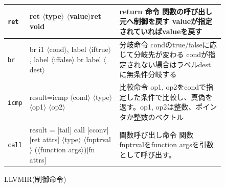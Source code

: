 \documentclass[dvipdfmx,a4j]{jbook}
\begin{document}
\begin{figure}[H]
\begin{center}
{\scriptsize
\begin{tabularx}{\textwidth}{|l|X|X|}\hline
{\tt ret} & 
ret $\langle$type$\rangle$ $\langle$value$\rangle$\newline ret void
&
return 命令\newline
関数の呼び出し元へ制御を戻す\newline
valueが指定されていればvalueを戻す
\\\hline
{\tt br} &
br i1 $\langle$cond$\rangle$, label $\langle$iftrue$\rangle$, label $\langle$iffalse$\rangle$\newline
br label $\langle$dest$\rangle$
&
分岐命令\newline
condのtrue/falseに応じて分岐先が変わる\newline
condが指定されない場合はラベルdestに無条件分岐する\\\hline
{\tt icmp} & 
result=icmp $\langle$cond$\rangle$ $\langle$type$\rangle$ $\langle$op1$\rangle$ $\langle$op2$\rangle$
&
比較命令\newline
op1, op2をcondで指定した条件で比較し、真偽を返す。op1, op2は整数、ポインタか整数のベクトル\\\hline
{\tt call} &
result = [tail] call [cconv] [ret attrs] $\langle$type$\rangle$\newline
{} $\langle$fnptrval$\rangle$\newline
\quad ($\langle$function args$\rangle$)[fn attrs]
&
関数呼び出し命令\newline
関数fnptrvalをfunction argsを引数として呼び出す。\\\hline
\end{tabularx}
}
\end{center}
\caption{LLVMIR(制御命令)}
\end{figure}
\end{document}
